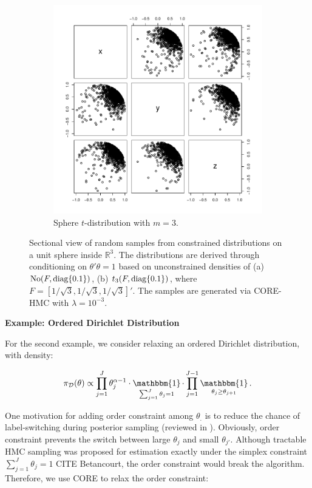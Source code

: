\documentclass[10pt,fleqn]{article}
\newcommand{\bb}[1]{\mathbb{#1}} \newcommand{\mc}[1]{\mathcal{#1}}
\DeclareMathOperator{\1}{\mathbbm{1}} \DeclareMathOperator{\bigO}{\mc O}
\begin{document}
\begin{figure}[h]
\begin{subfigure}[b]{0.45\textwidth}
\includegraphics[width=1\textwidth]{sphere_t}
\caption{Sphere $t$-distribution with $m=3$.}
\end{subfigure}
\caption{Sectional view of random samples from constrained distributions on a
unit sphere inside $\bb R^3$. The distributions are derived through conditioning
on $\theta'\theta=1$ based on unconstrained densities of (a) $\operatorname{No}( F,
\operatorname{diag}\{0.1\})$, (b) $t_3(F,\operatorname{diag}\{0.1\} )$, where
$F=[1/\sqrt{3},1/\sqrt{3},1/\sqrt{3}]'$. The samples are generated via CORE-HMC
with $\lambda=10^{-3}$. }
\label{sphere_examples}
\end{figure}

\textbf{Example: Ordered Dirichlet Distribution}

For the second example, we consider relaxing an ordered Dirichlet distribution, with density:

\begin{equation}
\begin{aligned}
\label{ordered_dp_prior}
\pi_{\mc D}(\theta) \propto \prod_{j=1}^J \theta_j^{\alpha-1} \cdot \1_{\sum_{j=1}^J \theta_j=1} \cdot  \prod_{j=1}^{J-1}\1_{\theta_j \ge \theta_{j+1}}.
\end{aligned}
\end{equation}

One motivation for adding order constraint among $\theta_.$ is to reduce the
chance of label-switching during posterior sampling (reviewed in
\cite{jasra2005markov}). 
Obviously, order constraint prevents the switch between large $\theta_j$ and
small $\theta_{j'}$. Although tractable HMC sampling was proposed for estimation 
exactly under the simplex constraint ${\sum_{j=1}^J \theta_j=1}$ CITE
Betancourt, the order constraint would break the algorithm. Therefore, we
use CORE to relax the order constraint:
\end{document}

